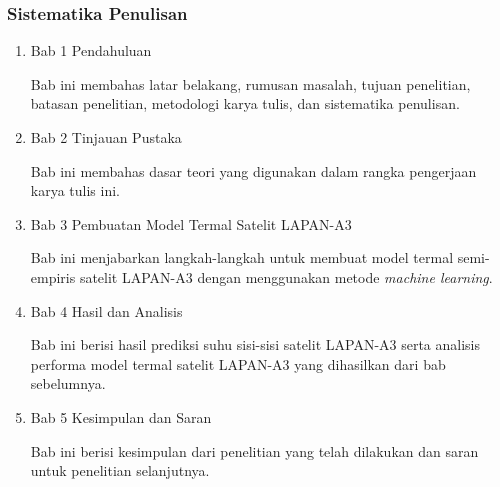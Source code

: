 \documentclass[8pt]{beamer}
\begin{document}
\begin{frame}
\end{frame}

\begin{frame}
  \frametitle{Sistematika Penulisan}
\begin{enumerate}
\item Bab 1 Pendahuluan

Bab ini membahas latar belakang, rumusan masalah, tujuan penelitian, batasan
penelitian, metodologi karya tulis, dan sistematika penulisan.

\item Bab 2 Tinjauan Pustaka

Bab ini membahas dasar teori yang digunakan dalam rangka pengerjaan karya tulis ini.

\item Bab 3 Pembuatan Model Termal Satelit LAPAN-A3

Bab ini menjabarkan langkah-langkah untuk membuat model termal semi-empiris
		satelit LAPAN-A3 dengan menggunakan metode \textit{machine learning}.

\item Bab 4 Hasil dan Analisis

Bab ini berisi hasil prediksi suhu sisi-sisi satelit LAPAN-A3 serta analisis performa model termal satelit LAPAN-A3 yang dihasilkan dari bab sebelumnya.

\item Bab 5 Kesimpulan dan Saran

Bab ini berisi kesimpulan dari penelitian yang telah dilakukan dan saran
untuk penelitian selanjutnya.
\end{enumerate}
\end{frame}


\end{document}
